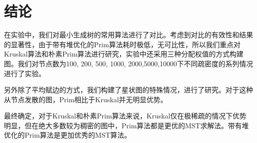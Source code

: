 \documentclass[UTF8]{ctexart}
\begin{document}
\section{结论}
在实验中，我们对最小生成树的常用算法进行了对比。考虑到对比的有效性和结果的显著性，由于带有堆优化的Prim算法耗时极低，无可比性，所以我们重点对Kruskal算法和朴素Prim算法进行研究，实验中还采用三种分配权值的方式构建图。我们对节点数为100, 200, 500, 1000, 2000,5000,10000下不同疏密度的系列情况进行了实验。

另外除了平均赋边的方式，我们构建了星状图的特殊情况，进行了研究。对于这种从节点发散的图，Prim相比于Kruskal并无明显优势。

最终确定，对于Kruskal和朴素Prim算法来说，Kruskal仅在极稀疏的情况下优势明显，但在绝大多数较为稠密的图中，Prim算法都是更优的MST求解法。带有堆优化的Prim算法是更加优秀的MST算法。

\newpage
% 

\end{document}
